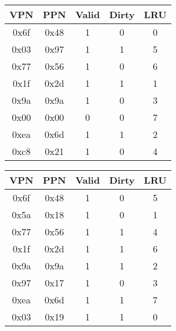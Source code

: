 \documentclass[answers]{exam}
\begin{document}
\begin{minipage}{\textwidth}
 \begin{minipage}[t]{0.45\textwidth}
  \centering
     \makeatletter{}\makeatother
       \begin{tabular}{|c|c|c|c|c|} 
      \hline
        \textbf{VPN} &\textbf{PPN} &\textbf{Valid} &\textbf{Dirty} &\textbf{LRU}\\
         \hline
        0x6f & 0x48 & 1 & 0 & 0\\
         \hline
        0x03 & 0x97 & 1 & 1 & 5\\
         \hline
        0x77 & 0x56 & 1 & 0 & 6\\
         \hline
        0x1f & 0x2d & 1 & 1 & 1\\
         \hline
        0x9a & 0x9a & 1 & 0 & 3\\
         \hline
        0x00 & 0x00 & 0 & 0 & 7\\
         \hline
        0xea & 0x6d & 1 & 1 & 2\\
         \hline
        0xc8 & 0x21 & 1 & 0 & 4\\
         \hline
    \end{tabular}
  \end{minipage}
  \begin{minipage}[t]{0.45\textwidth}
   \centering
        \makeatletter{}\makeatother
         \begin{tabular}{|c|c|c|c|c|} 
      \hline
        \textbf{VPN} &\textbf{PPN} &\textbf{Valid} &\textbf{Dirty} &\textbf{LRU}\\
         \hline
         0x6f & 0x48 & 1 & 0 & 5 \\
         \hline
         0x5a & 0x18 & 1 & 0 & 1 \\
         \hline
         0x77 & 0x56 & 1 & 1 & 4 \\
         \hline
         0x1f & 0x2d & 1 & 1 & 6 \\
         \hline
         0x9a & 0x9a & 1 & 1 & 2 \\
         \hline
         0x97 & 0x17 & 1 & 0 & 3 \\
         \hline
         0xea & 0x6d & 1 & 1 & 7 \\
         \hline
         0x03 & 0x19 & 1 & 1 & 0 \\
         \hline
    \end{tabular}
   \end{minipage}
\end{minipage}

\pagebreak
\end{document}
